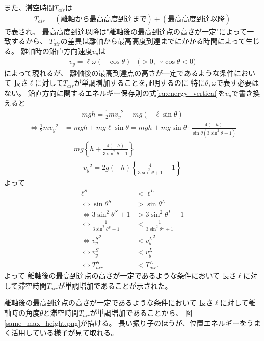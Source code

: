 \documentclass[a4paper,11pt]{jsarticle}
\begin{document}
また、滞空時間$T_{air}$は
\begin{align*}
  T_{air} = (\textrm{離軸から最高高度到達まで}) + (\textrm{最高高度到達以降})
\end{align*}
で表され、
最高高度到達以降は"離軸後の最高到達点の高さが一定"によって一致するから、
$T_{air}$の差異は離軸から最高高度到達までにかかる時間によって生じる。
離軸時の鉛直方向速度$v_y$は
\begin{align*}
  v_y = \ell\omega (-\cos\theta) \ \ \ \ \Big( > 0, \ \ \because \cos\theta < 0 \Big)
\end{align*}
によって現れるが、
離軸後の最高到達点の高さが一定であるような条件において
長さ$\ell$に対して$T_{air}$が単調増加することを証明するのに
特に$\theta, \omega$で表す必要はない。
鉛直方向に関するエネルギー保存則の式\ref{eq:energy_vertical}を$v_y$で書き換えると
\begin{align*}
  mgh = \frac{1}{2}m{v_y}^2 + mg (-\ell \sin\theta)
\end{align*}
\begin{align*}
  \Leftrightarrow
  \frac{1}{2}m{v_y}^2
  &= mgh + mg\ell\sin\theta
  = mgh + mg\sin\theta\cdot\frac{4(-h)}{\sin\theta(3\sin^2\theta + 1)}
  \\
  &= mg\left\{ h + \frac{4(-h)}{3\sin^2\theta + 1} \right\}
\end{align*}
\begin{align*}
  {v_y}^2 = 2g(-h)\left\{ \frac{4}{3\sin^2\theta + 1} - 1 \right\}
\end{align*}
よって
\begin{align*}
  \ell^S &< \ell^L
  \\
  \Leftrightarrow
  \sin\theta^S &> \sin\theta^L
  \\
  \Leftrightarrow
  3\sin^2\theta^S + 1 &> 3\sin^2\theta^L + 1
  \\
  \Leftrightarrow
  \frac{1}{3\sin^2\theta^S + 1} &< \frac{1}{3\sin^2\theta^L + 1}
  \\
  \Leftrightarrow
  {v_y^S}^2 &< {v_y^L}^2
  \\
  \Leftrightarrow
  v_y^S &< v_y^L
  \\
  \Leftrightarrow
  T_{air}^S &< T_{air}^L.
\end{align*}
よって
離軸後の最高到達点の高さが一定であるような条件において
長さ$\ell$に対して滞空時間$T_{air}$が単調増加であることが示された。

離軸後の最高到達点の高さが一定であるような条件において
長さ$\ell$に対して離軸時の角度$\theta$と滞空時間$T_{air}$が単調増加であることから、
図\ref{same_max_height.png}が描ける。
長い振り子のほうが、位置エネルギーをうまく活用している様子が見て取れる。
\end{document}
